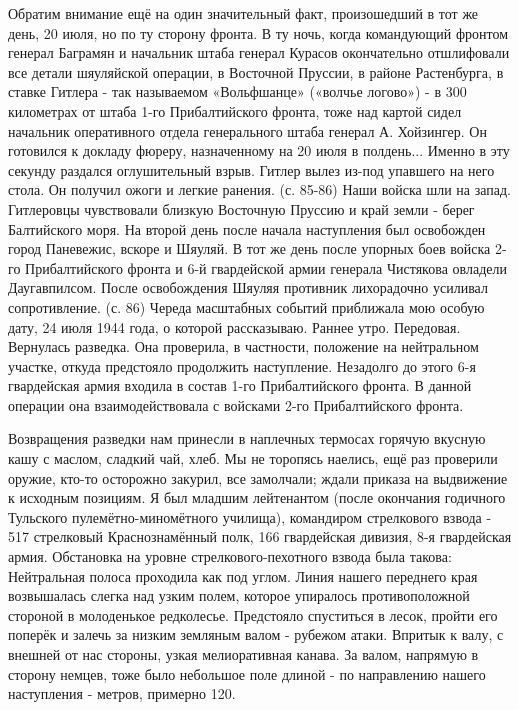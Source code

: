 \label{4-1}
Обратим внимание ещё на один значительный факт, произошедший в тот же день, 20 июля, но по ту сторону фронта. В ту ночь, когда командующий фронтом генерал Баграмян и начальник штаба генерал Курасов окончательно отшлифовали все детали шяуляйской операции, в Восточной Пруссии, в районе Растенбурга, в ставке Гитлера - так называемом «Вольфшанце» («волчье логово») - в 300 километрах от штаба 1-го Прибалтийского фронта, тоже над картой сидел начальник оперативного отдела генерального штаба генерал А. Хойзингер. Он готовился к докладу фюреру, назначенному на 20 июля в полдень... Именно в эту секунду раздался оглушительный взрыв. Гитлер вылез из-под упавшего на него стола. Он получил ожоги и легкие ранения. (с. 85-86) Наши войска шли на запад. Гитлеровцы чувствовали близкую Восточную Пруссию и край земли - берег Балтийского моря. На второй день после начала наступления был освобожден город Паневежис, вскоре и Шяуляй. В тот же день после упорных боев войска 2-го Прибалтийского фронта и 6-й гвардейской армии генерала Чистякова овладели Даугавпилсом. После освобождения Шяуляя противник лихорадочно усиливал сопротивление. (с. 86) Череда масштабных событий приближала мою особую дату, 24 июля 1944 года, о которой рассказываю. Раннее утро. Передовая. Вернулась разведка. Она проверила, в частности, положение на нейтральном участке, откуда предстояло продолжить наступление. Незадолго до этого 6-я гвардейская армия входила в состав 1-го Прибалтийского фронта. В данной операции она взаимодействовала с войсками 2-го Прибалтийского фронта.

\label{5-1}
Возвращения разведки нам принесли в наплечных термосах горячую вкусную кашу с маслом, сладкий чай, хлеб. Мы не торопясь наелись, ещё раз проверили оружие, кто-то осторожно закурил, все замолчали; ждали приказа на выдвижение к исходным позициям. Я был младшим лейтенантом (после окончания годичного Тульского пулемётно-миномётного училища), командиром стрелкового взвода - 517 стрелковый Краснознамённый полк, 166 гвардейская дивизия, 8-я гвардейская армия. Обстановка на уровне стрелкового-пехотного взвода была такова: Нейтральная полоса проходила как под углом. Линия нашего переднего края возвышалась слегка над узким полем, которое упиралось противоположной стороной в молоденькое редколесье. Предстояло спуститься в лесок, пройти его поперёк и залечь за низким земляным валом - рубежом атаки. Впритык к валу, с внешней от нас стороны, узкая мелиоративная канава. За валом, напрямую в сторону немцев, тоже было небольшое поле длиной - по направлению нашего наступления - метров, примерно 120.

